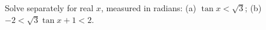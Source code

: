Solve separately for real $x$, measured in radians: (a) $\tan x<\sqrt3$; (b) $-2<\sqrt3\tan x+1<2$.
